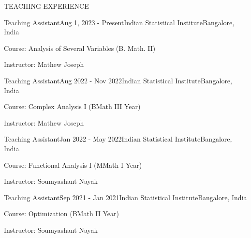 \documentclass{resume} %
\begin{document}
\begin{rSection}{TEACHING EXPERIENCE}
	
	\begin{rSubsection}{Teaching Assistant}{Aug 1, 2023 - Present}{Indian Statistical Institute}{Bangalore, India}
		\item Course: Analysis of Several Variables (B. Math. II)
		\item Instructor: Mathew Joseph
	\end{rSubsection}
	
	\begin{rSubsection}{Teaching Assistant}{Aug 2022 - Nov 2022}{Indian Statistical Institute}{Bangalore, India}
		\item Course: Complex Analysis I (BMath III Year)
		\item Instructor: Mathew Joseph
	\end{rSubsection}

	\begin{rSubsection}{Teaching Assistant}{Jan 2022 - May 2022}{Indian Statistical Institute}{Bangalore, India}
		\item Course: Functional Analysis I (MMath I Year)
		\item Instructor: Soumyashant Nayak
	\end{rSubsection}
	
	\begin{rSubsection}{Teaching Assistant}{Sep 2021 - Jan 2021}{Indian Statistical Institute}{Bangalore, India}
		\item Course: Optimization (BMath II Year)
		\item Instructor: Soumyashant Nayak
	\end{rSubsection}

\end{rSection}
\end{document}
